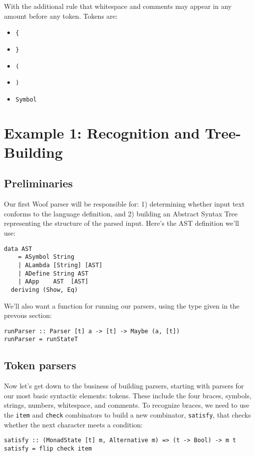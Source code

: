 \documentclass{tmr}
\begin{document}
With the additional rule that whitespace and comments may appear in any 
amount before any token.  Tokens are:
\begin{itemize}
  \item \verb+{+
  \item \verb+}+
  \item \verb+(+
  \item \verb+)+
  \item \verb+Symbol+
\end{itemize}




\section{Example 1: Recognition and Tree-Building}

\subsection{Preliminaries}
Our first Woof parser will be responsible for: 1) determining whether input
text conforms to the language definition, and 2) building an 
Abstract Syntax Tree representing the structure of the parsed input.
Here's the AST definition we'll use:
\begin{verbatim}
data AST
    = ASymbol String
    | ALambda [String] [AST]
    | ADefine String AST
    | AApp    AST  [AST]
  deriving (Show, Eq)
\end{verbatim}

We'll also want a function for running our parsers, using the type given in the
prevous section:
\begin{verbatim}
runParser :: Parser [t] a -> [t] -> Maybe (a, [t])
runParser = runStateT
\end{verbatim}

\subsection{Token parsers}
Now let's get down to the business of building parsers, starting with parsers
for our most basic syntactic elements:  tokens.
These include the four braces, symbols, strings, numbers, whitespace, and comments.
To recognize braces, we need to use the \verb+item+ and \verb+check+ 
combinators to build a new combinator, \verb+satisfy+, that checks whether 
the next character meets a condition:
\begin{verbatim}
satisfy :: (MonadState [t] m, Alternative m) => (t -> Bool) -> m t
satisfy = flip check item
\end{verbatim}
\end{document}
